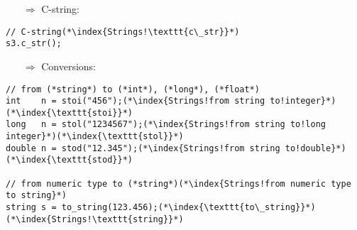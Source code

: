\documentclass[10pt]{article}
\begin{document}
\begin{enumerate}
\item[$\Rightarrow$] C-string:
\end{enumerate}
\begin{lstlisting}
// C-string(*\index{Strings!\texttt{c\_str}}*)
s3.c_str();
\end{lstlisting}
\begin{enumerate}
\item[$\Rightarrow$] Conversions:
\end{enumerate}
\begin{lstlisting}
// from (*string*) to (*int*), (*long*), (*float*)
int    n = stoi("456");(*\index{Strings!from string to!integer}*)(*\index{\texttt{stoi}}*)
long   n = stol("1234567");(*\index{Strings!from string to!long integer}*)(*\index{\texttt{stol}}*)
double n = stod("12.345");(*\index{Strings!from string to!double}*)(*\index{\texttt{stod}}*)

// from numeric type to (*string*)(*\index{Strings!from numeric type to string}*)
string s = to_string(123.456);(*\index{\texttt{to\_string}}*)(*\index{Strings!\texttt{string}}*)
\end{lstlisting}
%
%
\end{document}
